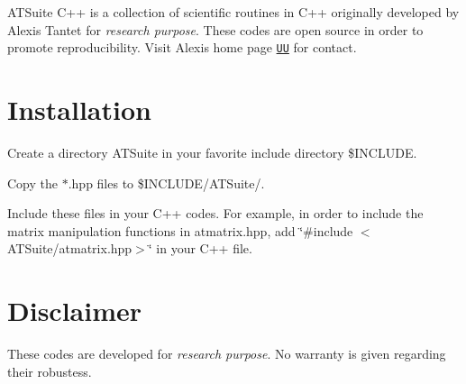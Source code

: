 A\+T\+Suite C++ is a collection of scientific routines in C++ originally developed by Alexis Tantet for {\itshape research purpose}. These codes are open source in order to promote reproducibility. Visit Alexis\textquotesingle{} home page \href{http://www.uu.nl/staff/AJJTantet/}{\tt UU} for contact.\hypertarget{index_installation}{}\section{Installation    }\label{index_installation}

\begin{DoxyItemize}
\item Create a directory A\+T\+Suite in your favorite include directory \$\+I\+N\+C\+L\+U\+DE.
\item Copy the $\ast$.hpp files to \$\+I\+N\+C\+L\+U\+DE/\+A\+T\+Suite/.
\item Include these files in your C++ codes. For example, in order to include the matrix manipulation functions in atmatrix.\+hpp, add \char`\"{}\#include $<$\+A\+T\+Suite/atmatrix.\+hpp$>$\char`\"{} in your C++ file.
\end{DoxyItemize}\hypertarget{index_disclaimer}{}\section{Disclaimer    }\label{index_disclaimer}
These codes are developed for {\itshape research purpose}. No warranty is given regarding their robustess. 